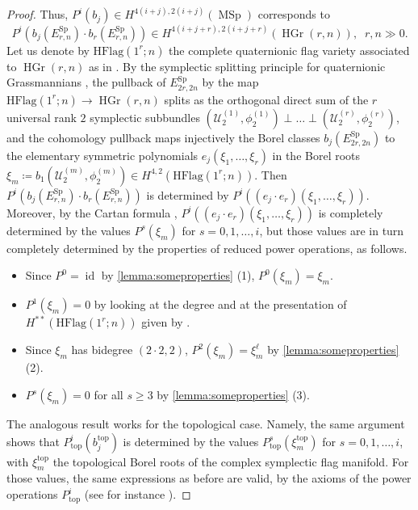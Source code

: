 \documentclass[10pt]{amsart}
\theoremstyle{definition}
\theoremstyle{plain}
\numberwithin{equation}{section}
\newcommand{\0}{\emptyset}
\newcommand{\MSp}{{\operatorname{MSp}}}
\newcommand{\Sp}{{\operatorname{Sp}}}
\newcommand{\HGr}{{\operatorname{HGr}}}
\renewcommand{\top}{{\operatorname{top}}}
\newcommand{\id}{{\operatorname{id}}}
\begin{document}
\begin{proof}
    Thus, $P^i(b_j)\in H^{4(i+j), 2(i+j)}(\MSp)$ corresponds to $$P^i(b_j(E^\Sp_{r,n})\cdot b_r(E^\Sp_{r,n}))\in H^{4(i+j+r), 2(i+j+r)}(\HGr(r, n)), \; \; r,n\gg0.$$ 
    Let us denote by $\text{HFlag}(1^r;n)$ the complete quaternionic flag variety associated to $\HGr(r,n)$ as in \cite[\S 3, p. 147]{panwal:grass}. By the symplectic splitting principle for quaternionic Grassmannians \cite[Theorem 10.1]{panwal:grass}, the pullback of $E^\Sp_{2r,2n}$ by the map $\text{HFlag}(1^r;n)\to \HGr(r,n)$ splits as the orthogonal direct sum of the $r$ universal rank $2$ symplectic subbundles $(\mathcal{U}_2^{(1)},\phi_2^{(1)}) \perp \ldots \perp (\mathcal{U}_2^{(r)},\phi_2^{(r)})$, and the cohomology pullback maps injectively the Borel classes $b_j(E^\Sp_{2r,2n})$ to the elementary symmetric polynomials $e_j(\xi_1,\ldots,\xi_r)$ in the Borel roots $\xi_m\coloneqq b_1(\mathcal{U}_2^{(m)},\phi_2^{(m)}) \in H^{4,2}(\text{HFlag}(1^r;n))$. Then $P^i(b_j(E^\Sp_{r,n})\cdot b_r(E^\Sp_{r,n}))$ is determined by $P^i((e_j \cdot e_r)(\xi_1,\ldots,\xi_r))$. Moreover, by the Cartan formula \cite[Proposition 9.7]{Voev-power}, $P^i((e_j \cdot e_r)(\xi_1,\ldots,\xi_r))$ is completely determined by the values $P^s(\xi_m)$ for $s=0,1,\ldots,i$, but those values are in turn completely determined by the properties of reduced power operations, as follows.
    \begin{itemize}
    \item Since $P^0=\id$ by \ref{lemma:someproperties} (1), $P^0(\xi_m)=\xi_m$. 
    \item $P^1(\xi_m)=0$ by looking at the degree and at the presentation of $H^{**}(\text{HFlag}(1^r;n))$ given by \cite[Theorem 11.1]{panwal:grass}.
    \item Since $\xi_m$ has bidegree $(2\cdot 2,2)$, $P^2(\xi_m)=\xi_m^{\ell}$ by \ref{lemma:someproperties} (2). 
    \item $P^s(\xi_m)=0$ for all $s \ge 3$ by \ref{lemma:someproperties} (3).
    \end{itemize}

    The analogous result works for the topological case. Namely, the same argument shows that $P^i_{\top}(b_j^{\top})$ is determined by the values $P^s_{\top}(\xi_m^{\top})$ for $s=0,1,\ldots,i$, with $\xi_m^{\top}$ the topological Borel roots of the complex symplectic flag manifold. For those values, the same expressions as before are valid, by the axioms of the power operations $P^i_{\top}$ (see for instance \cite[Chapter VI]{steenrod:cohomology}). 


\end{proof}
\end{document}
